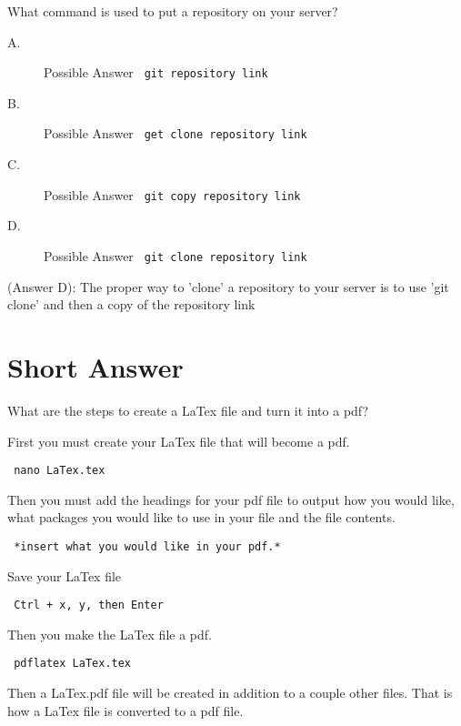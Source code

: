 \documentclass[12pt,answers]{exam}
\begin{document}
\begin{questions}
\question What command is used to put a repository on your server? 
\begin{description} 
\item[A.] Possible Answer \verb' git repository link' 
\item[B.] Possible Answer \verb' get clone repository link' 
\item[C.] Possible Answer \verb' git copy repository link' 
\item[D.] Possible Answer \verb' git clone repository link' 
\end{description} 
\begin{solution} 
(Answer D): The proper way to 'clone' a repository to your server is to use 'git clone' and then a copy of the 
repository link 
\end{solution}
\end{questions}
 
\section*{Short Answer} What are the steps to create a LaTex file and 
turn it into a pdf? 
\begin{solution} First you must create your LaTex file that will become a pdf. 

\verb' nano LaTex.tex'

Then you must add the headings for your pdf file to output how you would like, what packages you would like to use in your file and the file contents.

\verb' *insert what you would like in your pdf.*'

Save your LaTex file

\verb' Ctrl + x, y, then Enter'

Then you make the LaTex file a pdf.

\verb' pdflatex LaTex.tex'

Then a LaTex.pdf file will be created in addition to a couple other files. That is how a LaTex file is converted to a pdf file.
 
\end{solution}
\end{document}
